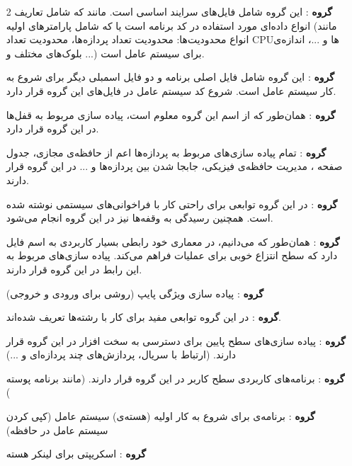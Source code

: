 \begin{itemize}
	\item [2] 
	\textbf{گروه }: 
	این گروه شامل فایل‌های سرایند اساسی است. مانند 
	که شامل تعاریف انواع داده‌ای مورد استفاده در کد برنامه است یا 
	که شامل پارامترهای اولیه (مانند انواع محدودیت‌ها: محدودیت تعداد پردازه‌ها، محدودیت تعداد CPUها و ...، اندازه‌ی بلوک‌های مختلف و ...) برای سیستم عامل است.
	
	\textbf{گروه }: 
	این گروه شامل فایل اصلی 
	برنامه و دو فایل اسمبلی دیگر برای شروع به کار سیستم عامل است. شروع کد سیستم عامل در فایل‌های این گروه قرار دارد.
	
	\textbf{گروه }: 
	همان‌طور که از اسم این گروه معلوم است، پیاده سازی مربوط به قفل‌ها در این گروه قرار دارد.
	
	\textbf{گروه }: 
	تمام پیاده سازی‌های مربوط به پردازه‌ها اعم از حافظه‌ی مجازی، جدول صفحه
	، 
	مدیریت حافظه‌ی فیزیکی، جابجا شدن بین پردازه‌ها و ... در این گروه قرار دارند.
	
	\textbf{گروه }: 
	در این گروه توابعی برای راحتی کار با فراخوانی‌های سیستمی نوشته شده است. همچنین رسیدگی به وقفه‌ها نیز در این گروه انجام می‌شود.
	
	\textbf{گروه }: 
	همان‌طور که می‌دانیم، 
	در معماری خود رابطی بسیار کاربردی به اسم فایل دارد که سطح انتزاع 
	خوبی برای عملیات 
	فراهم می‌کند. پیاده سازی‌های مربوط به این رابط در این گروه قرار دارند.
	
	\textbf{گروه }: 
	پیاده سازی ویژگی پایپ (روشی برای ورودی و خروجی)
	
	\textbf{گروه }: 
	در این گروه توابعی مفید برای کار با رشته‌ها تعریف شده‌اند.
	
	\textbf{گروه }: 
	پیاده سازی‌های سطح پایین برای دسترسی به سخت افزار در این گروه قرار دارند. (ارتباط با سریال، پردازش‌های چند پردازه‌ای و ...)
	
	\textbf{گروه }: 
	برنامه‌های کاربردی سطح کاربر در این گروه قرار دارند. (مانند برنامه پوسته 
	)
	
	\textbf{گروه }: 
	برنامه‌ی 
	برای شروع به کار اولیه (هسته‌ی) سیستم عامل (کپی کردن سیستم عامل در حافظه)
	
	\textbf{گروه }: 
	اسکریپتی برای لینکر هسته
	

\end{itemize}
